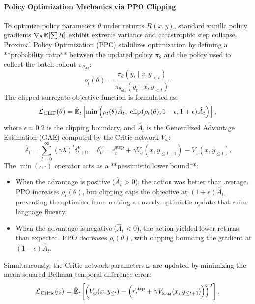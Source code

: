 \documentclass[../../main.tex]{subfiles}
\begin{document}
\paragraph{Policy Optimization Mechanics via PPO Clipping}
To optimize policy parameters $\theta$ under returns $R(x, y)$, standard vanilla policy gradients $\nabla_\theta \operatorname*{\mathbb{E}}[\sum R]$ exhibit extreme variance and catastrophic step collapse. Proximal Policy Optimization (PPO) \citep{schulman2017ppo} stabilizes optimization by defining a **probability ratio** between the updated policy $\pi_\theta$ and the policy used to collect the batch rollout $\pi_{\theta_{\text{old}}}$:
\begin{equation}
\label{eq:ppo_probability_ratio}
\rho_t(\theta) = \frac{\pi_\theta(y_t \mid x, y_{<t})}{\pi_{\theta_{\text{old}}}(y_t \mid x, y_{<t})}.
\end{equation}
The clipped surrogate objective function is formulated as:
\begin{equation}
\label{eq:ppo_clipping_formula}
\mathcal{L}_{\text{CLIP}}(\theta) = \hat{\operatorname*{\mathbb{E}}}_t \left[ \min\left( \rho_t(\theta)\hat{A}_t, \; \operatorname{clip}\left(\rho_t(\theta), 1-\epsilon, 1+\epsilon\right)\hat{A}_t \right) \right],
\end{equation}
where $\epsilon \approx 0.2$ is the clipping boundary, and $\hat{A}_t$ is the Generalized Advantage Estimation (GAE) computed by the Critic network $V_\omega$:
\begin{equation}
\hat{A}_t = \sum_{l=0}^{\infty} (\gamma \lambda)^l \delta_{t+l}^V, \quad \delta_t^V = r_t^{\text{step}} + \gamma V_\omega(x, y_{\le t+1}) - V_\omega(x, y_{\le t}).
\end{equation}
The $\min(\cdot, \cdot)$ operator acts as a **pessimistic lower bound**:
\begin{itemize}
    \item When the advantage is positive ($\hat{A}_t > 0$), the action was better than average. PPO increases $\rho_t(\theta)$, but clipping caps the objective at $(1+\epsilon)\hat{A}_t$, preventing the optimizer from making an overly optimistic update that ruins language fluency.
    \item When the advantage is negative ($\hat{A}_t < 0$), the action yielded lower returns than expected. PPO decreases $\rho_t(\theta)$, with clipping bounding the gradient at $(1-\epsilon)\hat{A}_t$.
\end{itemize}

Simultaneously, the Critic network parameters $\omega$ are updated by minimizing the mean squared Bellman temporal difference error:
\begin{equation}
\label{eq:critic_mse_loss}
\mathcal{L}_{\text{Critic}}(\omega) = \hat{\operatorname*{\mathbb{E}}}_t \left[ \left( V_\omega(x, y_{\le t}) - \left(r_t^{\text{step}} + \gamma V_{\omega_{\text{old}}}(x, y_{\le t+1})\right) \right)^2 \right].
\end{equation}
\end{document}
